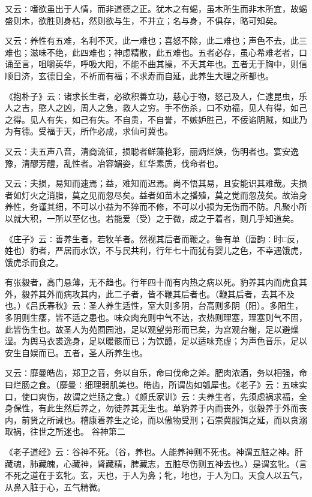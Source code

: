 \documentclass[a4paper,12pt,UTF8,twoside]{ctexbook}
\begin{document}
又云∶嗜欲虽出于人情，而非道德之正。犹木之有蝎，虽木所生而非木所宜，故蝎盛则木，欲胜则身枯，然则欲与生，不并立；名与身，不俱存，略可知矣。

又云∶养性有五难，名利不灭，此一难也；喜怒不除，此二难也；声色不去，此三难也；滋味不绝，此四难也；神虑精散，此五难也。五者必存，虽心希难老者，口诵至言，咀嚼英华，呼吸大阳，不能不曲其操，不夭其年也。五者无于胸中，则信顺日济，玄德日全，不祈而有福；不求寿而自延，此养生大理之所都也。

《抱朴子》云∶诸求长生者，必欲积善立功，慈心于物，怒己及人，仁逮昆虫，乐人之吉，愍人之凶，周人之急，救人之穷。手不伤杀，口不劝福，见人有得，如己之得。见人有失，如己有失。不自贵，不自誉，不嫉妒胜己，不佞谄阴贼，如此乃为有德。受福于天，所作必成，求仙可冀也。

又云∶夫五声八音，清商流征，损聪者鲜藻艳彩，丽炳烂焕，伤明者也。宴安逸豫，清醪芳醴，乱性者。冶容媚姿，红华素质，伐命者也。

又云∶夫损，易知而速焉；益，难知而迟焉。尚不悟其易，且安能识其难哉。夫损者如灯火之消脂，莫之见而忽尽矣。益者如苗木之播殖，莫之觉而忽茂矣。故治身养性，务谨其细，不可以小益为不猝而不修，不可以小损为无伤而不防。凡聚小所以就大积，一所以至亿也。若能爱（受）之于微，成之于着者，则几乎知道矣。

《庄子》云∶善养生者，若牧羊者。然视其后者而鞭之。鲁有单（唐韵∶时□反，姓也）豹者，严居而水饮，不与民共利，行年七十而犹有婴儿之色，不幸遇饿虎，饿虎杀而食之。

有张毅者，高门悬薄，无不趋也。行年四十而有内热之病以死。豹养其内而虎食其外，毅养其外而病攻其内，此二子者，皆不鞭其后者也。（鞭其后者，去其不及也。）《吕氏春秋》云∶圣人养生适性，室大则多阴，台高则多阴（阳）。多阳生，多阴则生痿，皆不适之患也。味众肉充则中气不达，衣热则理塞，理塞则气不固，此皆伤生也。故圣人为苑囿园池，足以观望劳形而已矣，为宫观台榭，足以避燥湿。为舆马衣裘逸身，足以暖骸而已；为饮醴，足以适味充虚；为声色音乐，足以安生自娱而已。五者，圣人所养生也。

又云∶靡曼皓齿，郑卫之音，务以自乐，命曰伐命之斧。肥肉浓酒，务以相强，命曰烂肠之食。（靡曼∶细理弱肌美也。皓齿，所谓齿如瓠犀也。《老子》云∶五味实口，使口爽伤，故谓之烂肠之食。）《颜氏家训》云∶夫养生者，先须虑祸求福，全身保性，有此生然后养之，勿徒养其无生也。单豹养于内而丧外，张毅养于外而丧内，前贤之所诫也。稽康着养生之论，而以傲物受刑；石崇冀服饵之延，而以贪溺取祸，往世之所迷也。
谷神第二

《老子道经》云∶谷神不死。（谷，养也。人能养神则不死也。神谓五脏之神。肝藏魂，肺藏魄，心藏神，肾藏精，脾藏志，五脏尽伤则五神去也。）是谓玄牝。（言不死之道在于玄牝。玄，天也，于人为鼻；牝，地也，于人为口。天食人以五气，从鼻入脏于心，五气精微。
\end{document}
